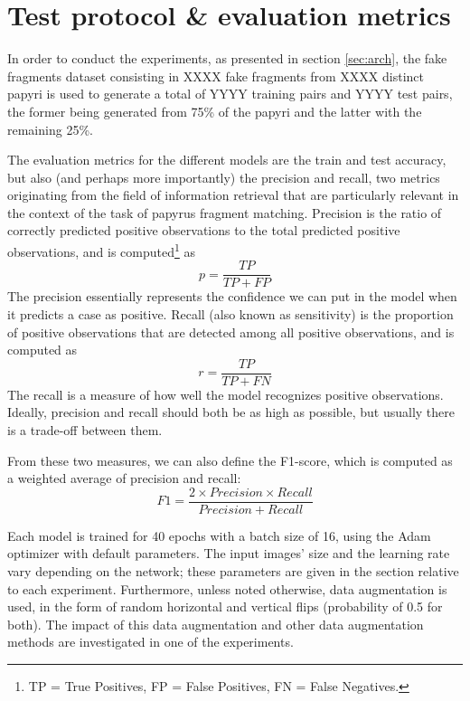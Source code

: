 \documentclass[11pt]{report}
\begin{document}
\section{Test protocol \& evaluation metrics}

In order to conduct the experiments, as presented in section \ref{sec:arch}, the fake fragments dataset consisting in XXXX fake fragments from XXXX distinct papyri is used to generate a total of YYYY training pairs and YYYY test pairs, the former being generated from 75\% of the papyri and the latter with the remaining 25\%.\newline

The evaluation metrics for the different models are the train and test accuracy, but also (and perhaps more importantly) the precision and recall, two metrics originating from the field of information retrieval that are particularly relevant in the context of the task of papyrus fragment matching.\newline
Precision is the ratio of correctly predicted positive observations to the total predicted positive observations, and is computed\footnote{TP = True Positives, FP = False Positives, FN = False Negatives.} as
$$p = \frac{TP}{TP + FP}$$
The precision essentially represents the confidence we can put in the model when it predicts a case as positive. Recall (also known as sensitivity) is the proportion of positive observations that are detected among all positive observations, and is computed as
$$r = \frac{TP}{TP + FN}$$
The recall is a measure of how well the model recognizes positive observations.\newline
Ideally, precision and recall should both be as high as possible, but usually there is a trade-off between them.\newline

From these two measures, we can also define the F1-score, which is computed as a weighted average of precision and recall:
$$F1 = \frac{2 \times Precision \times Recall}{Precision + Recall}$$

Each model is trained for 40 epochs with a batch size of 16, using the Adam optimizer with default parameters. The input images' size and the learning rate vary depending on the network; these parameters are given in the section relative to each experiment. Furthermore, unless noted otherwise, data augmentation is used, in the form of random horizontal and vertical flips (probability of 0.5 for both). The impact of this data augmentation and other data augmentation methods are investigated in one of the experiments.\newline
\end{document}
